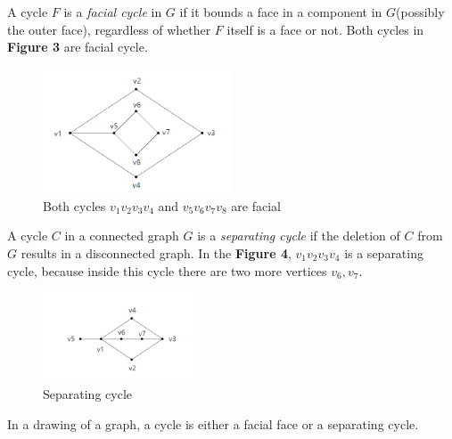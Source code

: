 \begin{definition}
A cycle $F$ is a \textit{facial cycle} in $G$ if it bounds a face in a component in $G$(possibly the outer face), regardless of whether $F$ itself is a face or not. \cite{dvorak2013threecoloring} Both cycles in \textbf{Figure 3} are facial cycle.
\begin{figure}[H] %
\centering %
\includegraphics[width=0.5\textwidth]{figure/facialcycle.png} 
\caption{Both cycles $v_1v_2v_3v_4$ and $v_5v_6v_7v_8$ are facial} %
\label{figure} %
\end{figure}
\end{definition}

\begin{definition}
A cycle $C$ in a connected graph $G$ is a \textit{separating cycle} if the deletion of $C$ from $G$ results in a disconnected graph. \cite{THOMASSEN197857} In the \textbf{Figure 4}, $v_1v_2v_3v_4$ is a separating cycle, because inside this cycle there are two more vertices $v_6, v_7$.
\begin{figure}[H] %
\centering %
\includegraphics[width=0.4\textwidth]{figure/separating cycle.png} 
\caption{Separating cycle} %
\label{figure} %
\end{figure}
\end{definition}

\begin{observation}
In a drawing of a graph, a cycle is either a facial face or a separating cycle.
\end{observation}

